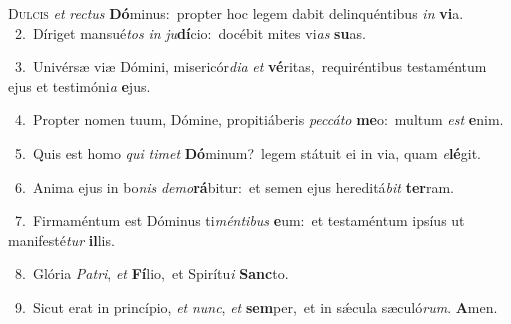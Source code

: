\lettrine{\initial\textcolor{\initialcolor}{D}}{ulcis} \textit{et} \textit{rec}\-\textit{tus} \textbf{Dó}\-minus:~\star propter hoc legem dabit delinquéntibus \textit{in} \textbf{vi}\-a.\\
{\numbfont\textcolor{\numbcolor}{~2.}}~Díriget mansué\textit{tos} \textit{in} \textit{ju}\-\textbf{dí}cio:~\star docébit mites vi\textit{as} \textbf{su}\-as.\par
{\numbfont\textcolor{\numbcolor}{~3.}}~Univérsæ viæ Dómini, misericór\-\textit{di}\-\textit{a} \textit{et} \textbf{vé}\-ritas,~\star requiréntibus testaméntum ejus et testimóni\textit{a} \textbf{e}\-jus.\par
{\numbfont\textcolor{\numbcolor}{~4.}}~Propter nomen tuum, Dómine, propitiáberis \textit{pec}\-\textit{cá}\textit{to} \textbf{me}\-o:~\star multum \textit{est} \textbf{e}\-nim.\par
{\numbfont\textcolor{\numbcolor}{~5.}}~Quis est homo \textit{qui} \textit{ti}\-\textit{met} \textbf{Dó}\-minum?~\star legem státuit ei in via, quam \textit{e}\-\textbf{lé}git.\par
{\numbfont\textcolor{\numbcolor}{~6.}}~Anima ejus in bo\textit{nis} \textit{de}\-\textit{mo}\textbf{rá}bitur:~\star et semen ejus hereditá\textit{bit} \textbf{ter}\-ram.\par
{\numbfont\textcolor{\numbcolor}{~7.}}~Firmaméntum est Dóminus ti\-\textit{mén}\-\textit{ti}\textit{bus} \textbf{e}\-um:~\star et testaméntum ipsíus ut manifesté\textit{tur} \textbf{il}\-lis.\par
{\numbfont\textcolor{\numbcolor}{~8.}}~Glória \textit{Pa}\-\textit{tri}, \textit{et} \textbf{Fí}\-lio,~\star et Spirítu\textit{i} \textbf{Sanc}\-to.\par
{\numbfont\textcolor{\numbcolor}{~9.}}~Sicut erat in princípio, \textit{et} \textit{nunc}\-, \textit{et} \textbf{sem}\-per,~\star et in sǽcula sæculó\-\textit{rum}\-. \textbf{A}\-men.\par

